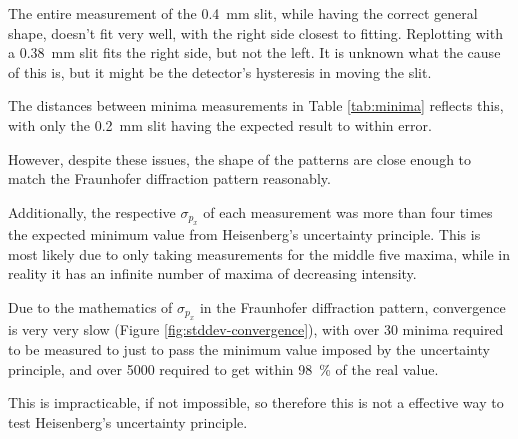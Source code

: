 \documentclass[a4paper]{scrartcl}
\begin{document}
The entire measurement of the \SI{0.4}{\milli\metre} slit, while having the correct general shape, doesn't fit very well, with the right side closest to fitting. Replotting with a \SI{0.38}{\milli\metre} slit fits the right side, but not the left. It is unknown what the cause of this is, but it might be the detector's hysteresis in moving the slit.

The distances between minima measurements in Table \ref{tab:minima} reflects this, with only the \SI{0.2}{\milli\metre} slit having the expected result to within error.

However, despite these issues, the shape of the patterns are close enough to match the Fraunhofer diffraction pattern reasonably.

Additionally, the respective \(\sigma_{p_x}\) of each measurement was more than four times the expected minimum value from Heisenberg's uncertainty principle. This is most likely due to only taking measurements for the middle five maxima, while in reality it has an infinite number of maxima of decreasing intensity.

Due to the mathematics of \(\sigma_{p_x}\) in the Fraunhofer diffraction pattern, convergence is very very slow (Figure \ref{fig:stddev-convergence}), with over 30 minima required to be measured to just to pass the minimum value imposed by the uncertainty principle, and over 5000 required to get within \SI{98}{\percent} of the real value.

This is impracticable, if not impossible, so therefore this is not a effective way to test Heisenberg's uncertainty principle.
\end{document}
